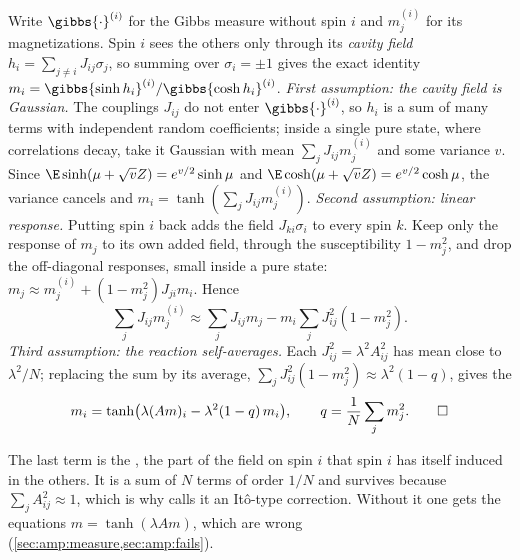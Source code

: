 \begin{refsection}
\begin{heuristic}
Write $\gibbs{\cdot}^{(i)}$ for the Gibbs measure without spin $i$ and $m_j^{(i)}$ for its magnetizations. Spin $i$ sees the others only through its \emph{cavity field} $h_i=\sum_{j\ne i}J_{ij}\sigma_j$, so summing over $\sigma_i=\pm1$ gives the exact identity $m_i=\gibbs{\sinh h_i}^{(i)}/\gibbs{\cosh h_i}^{(i)}$.
\emph{First assumption: the cavity field is Gaussian.} The couplings $J_{ij}$ do not enter $\gibbs{\cdot}^{(i)}$, so $h_i$ is a sum of many terms with independent random coefficients; inside a single pure state, where correlations decay, take it Gaussian with mean $\sum_jJ_{ij}m_j^{(i)}$ and some variance $v$. Since $\E\sinh(\mu+\sqrt vZ)=e^{v/2}\sinh\mu$ and $\E\cosh(\mu+\sqrt vZ)=e^{v/2}\cosh\mu$, the variance cancels and $m_i=\tanh(\sum_jJ_{ij}m_j^{(i)})$.
\emph{Second assumption: linear response.} Putting spin $i$ back adds the field $J_{ki}\sigma_i$ to every spin $k$. Keep only the response of $m_j$ to its own added field, through the susceptibility $1-m_j^2$, and drop the off-diagonal responses, small inside a pure state: $m_j\approx m_j^{(i)}+(1-m_j^2)J_{ji}m_i$. Hence
\[
\sum_jJ_{ij}m_j^{(i)}\approx\sum_jJ_{ij}m_j-m_i\sum_jJ_{ij}^2(1-m_j^2).
\]
\emph{Third assumption: the reaction self-averages.} Each $J_{ij}^2=\lambda^2A_{ij}^2$ has mean close to $\lambda^2/N$; replacing the sum by its average, $\sum_jJ_{ij}^2(1-m_j^2)\approx\lambda^2(1-q)$, gives the 
\begin{equation}\label{eq:amp:tap}
m_i=\tanh\bigl(\lambda(Am)_i-\lambda^2(1-q)\,m_i\bigr),\qquad q=\frac1N\sum_jm_j^2.\qedhere
\end{equation}
\end{heuristic}

The last term is the , the part of the field on spin $i$ that spin $i$ has itself induced in the others. It is a sum of $N$ terms of order $1/N$ and survives because $\sum_jA_{ij}^2\approx1$, which is why \textcite{Bolthausen2014} calls it an Itô-type correction. Without it one gets the  equations $m=\tanh(\lambda Am)$, which are wrong (\cref{sec:amp:measure,sec:amp:fails}).


\end{refsection}
